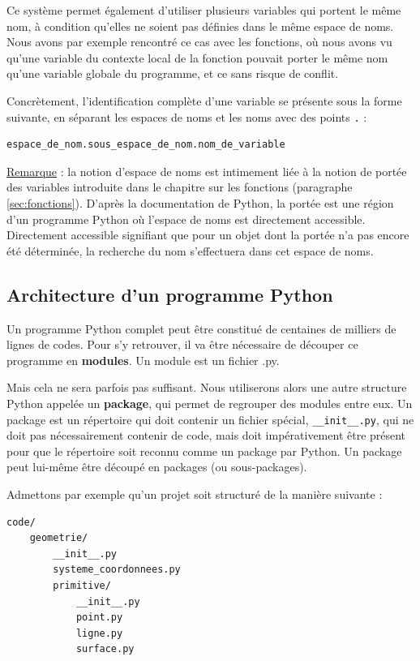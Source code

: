 \documentclass[12pt, a4paper]{article}
\begin{document}
Ce système permet également d'utiliser plusieurs variables qui portent le même nom, à condition qu'elles ne soient pas définies dans le même espace de noms. Nous avons par exemple rencontré ce cas avec les fonctions, où nous avons vu qu'une variable du contexte local de la fonction pouvait porter le même nom qu'une variable globale du programme, et ce sans risque de conflit.

Concrètement, l'identification complète d'une variable se présente sous la forme suivante, en séparant les espaces de noms et les noms avec des points \lstinline{.} :
\begin{lstlisting}
espace_de_nom.sous_espace_de_nom.nom_de_variable
\end{lstlisting}

\underline{Remarque} : la notion d'espace de noms est intimement liée à la notion de portée des variables introduite dans le chapitre sur les fonctions (paragraphe \ref{sec:fonctions}). D'après la documentation de Python, la portée est une région d'un programme Python où l'espace de noms est directement accessible. Directement accessible signifiant que pour un objet dont la portée n'a pas encore été déterminée, la recherche du nom s'effectuera dans cet espace de noms.


\subsection{Architecture d'un programme Python}
Un programme Python complet peut être constitué de centaines de milliers de lignes de codes. Pour s'y retrouver, il va être nécessaire de découper ce programme en \textbf{modules}. Un module est un fichier .py. 

Mais cela ne sera parfois pas suffisant. Nous utiliserons alors une autre structure Python appelée un \textbf{package}, qui permet de regrouper des modules entre eux. Un package est un répertoire qui doit contenir un fichier spécial, \lstinline{__init__.py}, qui ne doit pas nécessairement contenir de code, mais doit impérativement être présent pour que le répertoire soit reconnu comme un package par Python. Un package peut lui-même être découpé en packages (ou sous-packages).

Admettons par exemple qu'un projet soit structuré de la manière suivante :
\begin{lstlisting}
code/
    geometrie/
        __init__.py
        systeme_coordonnees.py
        primitive/
            __init__.py
            point.py
            ligne.py
            surface.py
\end{lstlisting}
\end{document}
